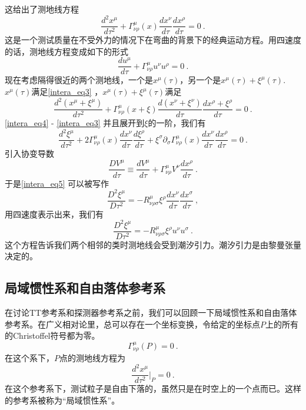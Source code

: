 这给出了测地线方程
\begin{equation}\label{intera_eq3}
\frac{d^2 x^\mu}{d \tau^2} + \Gamma^\mu_{\nu\rho} (x) \frac{dx^\nu}{d \tau} \frac{dx^\rho}{d\tau} = 0~. 
\end{equation}
这是一个测试质量在不受外力的情况下在弯曲的背景下的经典运动方程。用四速度的话，测地线方程变成如下的形式
\begin{equation}
\frac{du^\mu}{d\tau} + \Gamma^\mu_{\nu\rho} u^\nu u^\rho = 0~.
\end{equation}
现在考虑隔得很近的两个测地线，一个是$x^\mu(\tau)$，另一个是$x^\mu(\tau)+\xi^\mu(\tau)$. $x^\mu(\tau)$满足\autoref{intera_eq3} ，$x^\mu(\tau) + \xi^\mu(\tau)$满足
\begin{equation}\label{intera_eq4}
\frac{d^2(x^\mu+\xi^\mu)}{d\tau^2} + \Gamma^\mu_{\nu\rho} (x+\xi) \frac{d(x^\nu+\xi^\nu)}{d\tau} \frac{d x^\rho+\xi^\rho}{d \tau} = 0~.
\end{equation}
\autoref{intera_eq4} - \autoref{intera_eq3} 并且展开到$\xi$的一阶，我们有
\begin{equation}\label{intera_eq5}
\frac{d^2 \xi^\mu}{d \tau^2} + 2 \Gamma^\mu_{\nu\rho} (x) \frac{dx^\nu}{d\tau} \frac{d\xi^\rho}{d\tau} + \xi^\sigma \partial_\sigma \Gamma^\mu_{\nu\rho} (x) \frac{dx^\nu}{d\tau} \frac{dx^\rho}{d\tau} = 0 ~. 
\end{equation}
引入协变导数
\begin{equation}
\frac{D V^\mu}{d\tau} \equiv \frac{d V^\mu}{d\tau} + \Gamma^\mu_{\nu\rho} V^\nu \frac{dx^\rho}{d\tau} ~.
\end{equation}
于是\autoref{intera_eq5} 可以被写作
\begin{equation}
\frac{D^2 \xi^\mu}{D \tau^2} = - R^\mu_{\nu\rho\sigma} \xi^\rho \frac{dx^\nu}{d\tau} \frac{dx^\sigma}{d\tau} ~,
\end{equation}
用四速度表示出来，我们有
\begin{equation}
\frac{D^2 \xi^\mu}{D\tau^2} = - R^\mu_{\nu\rho\sigma} \xi^\rho u^\nu u^\sigma ~. 
\end{equation}
这个方程告诉我们两个相邻的类时测地线会受到潮汐引力。潮汐引力是由黎曼张量决定的。

\subsection{局域惯性系和自由落体参考系}
在讨论TT参考系和探测器参考系之前，我们可以回顾一下局域惯性系和自由落体参考系。在广义相对论里，总可以存在一个坐标变换，令给定的坐标点$P$上的所有的Christoffel符号都为零。
\begin{equation}
\Gamma^\mu_{\nu\rho} (P) = 0 ~.
\end{equation}
在这个系下，$P$点的测地线方程为
\begin{equation}
\frac{d^2 x^\mu}{d\tau^2} \bigg|_{P} = 0 ~.
\end{equation}
在这个参考系下，测试粒子是自由下落的，虽然只是在时空上的一个点而已。这样的参考系被称为“局域惯性系”。

